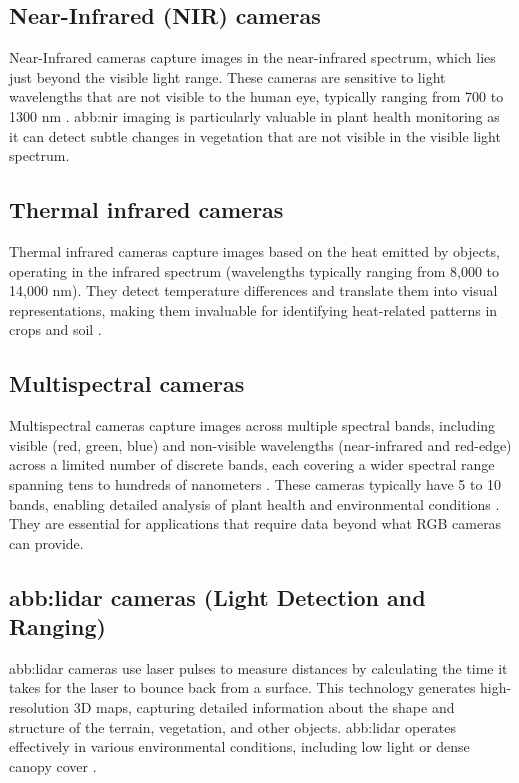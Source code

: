 \subsection{Near-Infrared (NIR) cameras}

Near-Infrared cameras capture images in the near-infrared spectrum, which lies just beyond the visible light range. These cameras are sensitive to light wavelengths that are not visible to the human eye, typically ranging from 700 to 1300 nm \parencite{delavarpour2021technical}. \gls{abb:nir} imaging is particularly valuable in plant health monitoring as it can detect subtle changes in vegetation that are not visible in the visible light spectrum.

\subsection{Thermal infrared cameras}

Thermal infrared cameras capture images based on the heat emitted by objects, operating in the infrared spectrum (wavelengths typically ranging from 8,000 to 14,000 nm). They detect temperature differences and translate them into visual representations, making them invaluable for identifying heat-related patterns in crops and soil \parencite{delavarpour2021technical}.


\subsection{Multispectral cameras}

Multispectral cameras capture images across multiple spectral bands, including visible (red, green, blue) and non-visible wavelengths (near-infrared and red-edge) across a limited number of discrete bands, each covering a wider spectral range spanning tens to hundreds of nanometers \parencite{lu2020recent}. These cameras typically have 5 to 10 bands, enabling detailed analysis of plant health and environmental conditions \parencite{delavarpour2021technical}. They are essential for applications that require data beyond what RGB cameras can provide.

\subsection{\gls{abb:lidar} cameras (Light Detection and Ranging)}

\gls{abb:lidar} cameras use laser pulses to measure distances by calculating the time it takes for the laser to bounce back from a surface. This technology generates high-resolution 3D maps, capturing detailed information about the shape and structure of the terrain, vegetation, and other objects. \gls{abb:lidar} operates effectively in various environmental conditions, including low light or dense canopy cover \parencite{delavarpour2021technical}.


